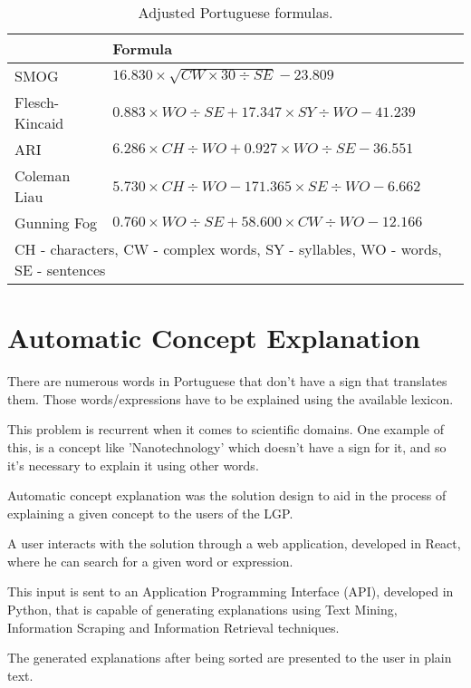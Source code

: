 \documentclass[runningheads]{llncs}
\begin{document}
\begin{table}
    \caption{Adjusted Portuguese formulas.}
    \label{table:ptformulas}
    \begin{tabular}{l|l}
        \hline
        {} & {\bfseries Formula} \\
        \hline
        SMOG & \(16.830 \times \sqrt{CW \times 30 \div SE} - 23.809\)  \\
        \hline
        Flesch-Kincaid & \(0.883 \times WO \div SE + 17.347 \times SY \div WO - 41.239\) \\
        \hline
        ARI & \(6.286 \times CH \div WO + 0.927 \times WO \div SE - 36.551\) \\
        \hline
        Coleman Liau & \(5.730 \times CH \div WO - 171.365 \times SE \div WO - 6.662\) \\
        \hline
        Gunning Fog & \(0.760 \times WO \div SE + 58.600 \times CW \div WO - 12.166\) \\
        \hline
        \multicolumn{2}{l}{CH - characters, CW - complex words, SY - syllables, WO - words, SE - sentences}
    \end{tabular}
\end{table}

\section{Automatic Concept Explanation}

There are numerous words in Portuguese that don't have a sign that translates them.
Those words/expressions have to be explained using the available lexicon.

This problem is recurrent when it comes to scientific domains.
One example of this, is a concept like 'Nanotechnology' which doesn't have a sign for it, and so it's necessary to explain it using other words.

Automatic concept explanation was the solution design to aid in the process of explaining a given concept to the users of the LGP.

A user interacts with the solution through a web application, developed in React, where he can search for a given word or expression.

This input is sent to an Application Programming Interface (API), developed in Python, that is capable of generating explanations using Text Mining, Information Scraping and Information Retrieval techniques.

The generated explanations after being sorted are presented to the user in plain text.
\end{document}
